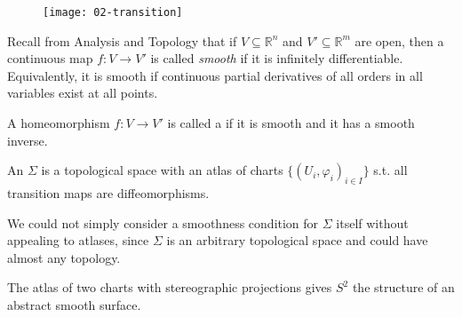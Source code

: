 \begin{figure}[h] 
    \centering 
    \texttt{[image: 02-transition]} 
\end{figure}

Recall from Analysis and Topology that if $V \subseteq \mathbb R^n$ and $V' \subseteq \mathbb R^m$ are open, then a continuous map $f \colon V \to V'$ is called \textit{smooth} if it is infinitely differentiable.
Equivalently, it is smooth if continuous partial derivatives of all orders in all variables exist at all points.

\begin{definition}[Diffeomorphism]
	A homeomorphism $f : V \to V'$ is called a  if it is smooth and it has a smooth inverse.
\end{definition} 

\begin{definition}
	An  $\Sigma$ is a topological space with an atlas of charts $\{(U_i, \varphi_i)_{i \in I}\}$ s.t. all transition maps are diffeomorphisms.
\end{definition}

\begin{remark}
	We could not simply consider a smoothness condition for $\Sigma$ itself without appealing to atlases, since $\Sigma$ is an arbitrary topological space and could have almost any topology.
\end{remark}

\begin{example}
	The atlas of two charts with stereographic projections gives $S^2$ the structure of an abstract smooth surface.
\end{example}

